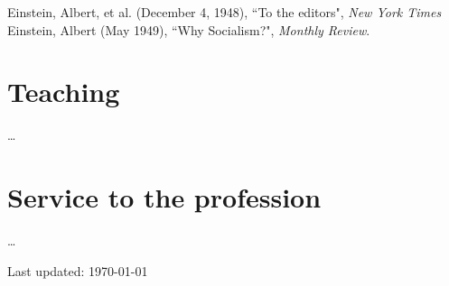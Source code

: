 \documentclass[11pt]{article} %
\begin{document}
Einstein, Albert, et al. (December 4, 1948), “To the editors", \emph{New York Times}\\
Einstein, Albert (May 1949), “Why Socialism?", \emph{Monthly Review}.


\section*{Teaching}

\ldots


\section*{Service to the profession}

\ldots

\vfill %


\fi
\begin{center}
	\scriptsize
	Last updated: \today
\end{center}

\end{document}
